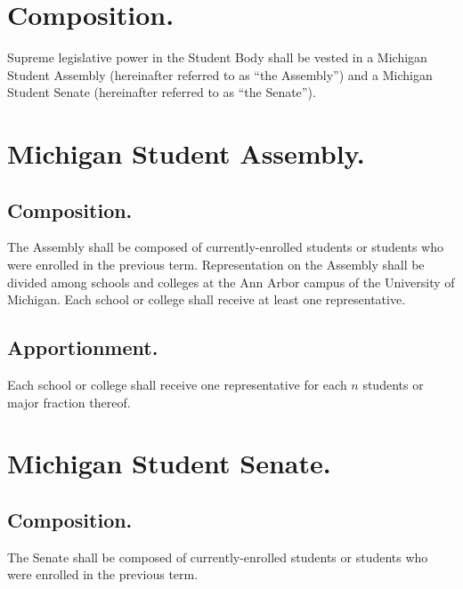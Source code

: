 
\section{Composition.}
Supreme legislative power in the Student Body shall be vested in a Michigan Student Assembly (hereinafter referred to as ``the Assembly'') and a Michigan Student Senate (hereinafter referred to as ``the Senate'').

\section{Michigan Student Assembly.}

\subsection{Composition.} The Assembly shall be composed of currently-enrolled students or students who were enrolled in the previous term.  Representation on the Assembly shall be divided among schools and colleges at the Ann Arbor campus of the University of Michigan.  Each school or college shall receive at least one representative.

\subsection{Apportionment.} Each school or college shall receive one representative for each $n$ students or major fraction thereof.

\section{Michigan Student Senate.}

\subsection{Composition.} The Senate shall be composed of currently-enrolled students or students who were enrolled in the previous term.


